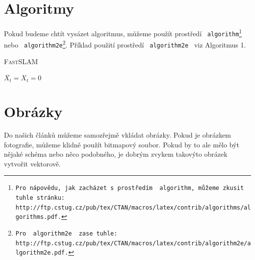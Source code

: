 \documentclass[11pt,a4paper]{article}
\begin{document}
\section{Algoritmy \label{sec3}}
Pokud budeme chtít vysázet algoritmus, můžeme použít prostředí \texttt{ algorithm\footnote{Pro nápovědu, jak zacházet s prostředím \texttt{ algorithm}, můžeme zkusit tuhle stránku: \\
http://ftp.cstug.cz/pub/tex/CTAN/macros/latex/contrib/algorithms/algorithms.pdf.}} nebo \texttt{ algorithm2e\footnote{Pro \texttt{ algorithm2e } zase tuhle:
http://ftp.cstug.cz/pub/tex/CTAN/macros/latex/contrib/algorithm2e/algorithm2e.pdf.}}.
Příklad použití prostředí \texttt{ algorithm2e } viz Algoritmus 1.
\vspace{2mm}
\IncMargin{1em}
\begin{algorithm}\label{alg1}
\caption{\textsc{Fast}SLAM}
\SetAlgoNoLine
\SetNlSkip{0.2em}
\DontPrintSemicolon
{}
\Indm
{}
\Indp
 \BlankLine
 $\overline{X_t} = X_t = 0$\\ 
\end{algorithm}
\DecMargin{1em}
\section{Obrázky \label{sec4}}
Do našich článků můžeme samozřejmě vkládat obrázky. Pokud je obrázkem fotografie,
můžeme klidně použít bitmapový soubor. Pokud by to ale mělo být nějaké schéma nebo
něco podobného, je dobrým zvykem takovýto obrázek vytvořit vektorově.
\end{document}
